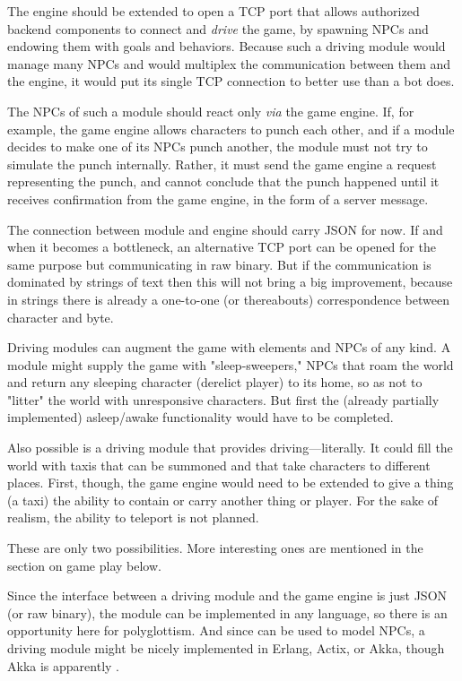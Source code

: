 The engine should be extended to open a TCP port that allows authorized backend
components to connect and {\em drive} the game, by spawning NPCs and endowing
them with goals and behaviors.
Because such a driving module would manage many NPCs and
would multiplex the communication between them
and the engine, it would put its single TCP connection to better use than a
bot does.

The NPCs of such a module should react only
{\em via} the game engine.
If, for example, the game engine allows characters to
punch each other, and if a module decides to make one of its NPCs
punch another, the module must not try to simulate the punch internally.
Rather, it must send the game engine a request representing the punch, and
cannot conclude that the punch happened until it receives confirmation from the
game engine, in the form of a server message.

The connection between module and engine should carry JSON for now.
If and when
it becomes a bottleneck, an alternative TCP port can be opened for the same
purpose but communicating in raw binary.
But if the communication is dominated
by strings of text then this will not bring a big improvement, because in
strings there is already a one-to-one (or thereabouts) correspondence between
character and byte.

Driving modules can augment the game with elements and NPCs of any kind.
A module might supply the game with "sleep-sweepers," NPCs that
roam the world and return any sleeping character (derelict player) to its
home, so as not to "litter" the world with unresponsive characters.
But first
the (already partially implemented) asleep/awake functionality would have to
be completed.

Also possible is a driving module that provides driving---literally.
It could
fill the world with taxis that can be summoned and that take characters to
different places.
First, though, the game engine would need to be extended to
give a thing (a taxi) the ability to contain or carry another thing or player.
For the sake of realism, the ability to teleport is not planned.

These are only two possibilities.
More interesting ones are mentioned in the section on game play below.

Since the interface between a driving module and the game engine is just JSON
(or raw binary), the module can be implemented in any language, so there is
an opportunity here for polyglottism.
And since
 can be used to
model NPCs, a driving module might be nicely implemented in Erlang, Actix,
or Akka, though Akka is apparently
.

